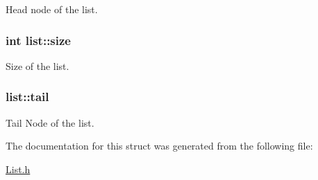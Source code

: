 Head node of the list. 

\hypertarget{structlist_a3b03adad0c0429bae9493667ff366dc2}{
\subsubsection[{size}]{\setlength{\rightskip}{0pt plus 5cm}int {\bf list::size}}}
\label{structlist_a3b03adad0c0429bae9493667ff366dc2}


Size of the list. 

\hypertarget{structlist_a7fba27040dab68e2d6acc2885b6df167}{
\subsubsection[{tail}]{ {\bf list::tail}}}
\label{structlist_a7fba27040dab68e2d6acc2885b6df167}


Tail Node of the list. 



The documentation for this struct was generated from the following file:\begin{DoxyCompactItemize}
\item 
\hyperlink{List_8h}{List.h}\end{DoxyCompactItemize}
